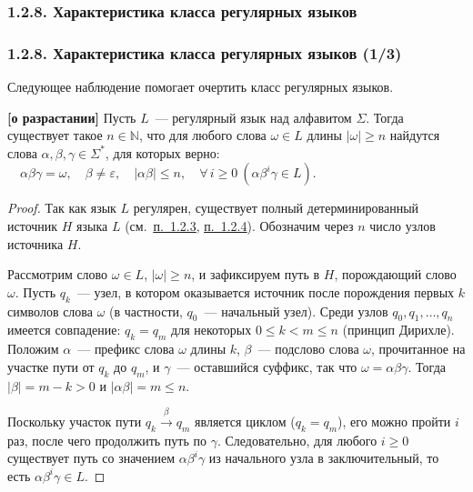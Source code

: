 \documentclass[mathserif,12pt,aspectratio=169]{beamer}
\def\NB#1{{\bf\color{brown}#1}}
\def\A#1#2{\forall\,#1\ \left(#2\right)}
\def\To#1{\stackrel{#1}{\longrightarrow}}
\let\Bbb\mathbb
\let\le\leqslant
\let\ge\geqslant
\def\DMref#1#2{{\color{blue}\underline{\hyperlink{#2}{#1}}}}
\begin{document}
\subsubsection{1.2.8. Характеристика класса регулярных языков}\label{1.2.8.}
\begin{frame}
\frametitle{1.2.8. Характеристика класса регулярных языков (1/3) }
Следующее наблюдение помогает очертить класс регулярных языков. 

\begin{lemma} {\NB{[о разрастании]}}
Пусть $L$~--- регулярный язык над алфавитом $\Sigma$.
Тогда существует такое $n\in \Bbb{N}$, что для любого слова $\omega\in L$
длины $|\omega|\ge n$ найдутся слова $\alpha,\beta,\gamma\in\Sigma^*$, 
для которых верно:
$\quad
\alpha\beta\gamma=\omega,\quad \beta\ne\varepsilon,\quad |\alpha\beta|\le n,\quad
\A{i\ge 0}{\alpha \beta^i \gamma\in L} 
$.
\end{lemma}


\begin{proof}
Так как язык $L$ регулярен, существует полный детерминированный источник
$H$ языка $L$ (см.~\DMref{п.~1.2.3}{1.2.3.}, \DMref{п.~1.2.4}{1.2.4.}). Обозначим через $n$ число узлов
источника $H$.

Рассмотрим слово $\omega\in L$, $|\omega|\ge n$, и зафиксируем путь в $H$,
порождающий слово $\omega$.
Пусть $q_k$~--- узел, в котором оказывается источник после порождения первых $k$
символов слова $\omega$ (в частности, $q_0$~--- начальный узел).
Среди узлов $q_0,q_1,\dots,q_n$ имеется совпадение:
$q_k=q_m$ для некоторых $0\le k < m \le n$ (принцип Дирихле).
Положим
$\alpha$~--- префикс слова $\omega$ длины $k$,
$\beta$~--- подслово слова $\omega$, прочитанное на участке пути от $q_k$ до $q_m$,
и $\gamma$~--- оставшийся суффикс, так что $\omega=\alpha\beta\gamma$.
Тогда $|\beta|=m-k>0$ и $|\alpha\beta|= m \le n$.

Поскольку участок пути $q_k\To{\beta}q_m$ является циклом ($q_k=q_m$),
его можно пройти $i$ раз, после чего продолжить путь по $\gamma$.
Следовательно, для любого $i\ge 0$ существует путь со значением $\alpha\beta^i\gamma$
из начального узла в заключительный, то есть $\alpha\beta^i\gamma\in L$.
\end{proof}

\end{frame}
\end{document}
